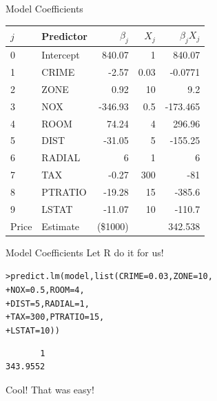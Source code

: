 \documentclass{beamer}\usepackage[]{graphicx}\usepackage[]{color}
\makeatletter
\newcommand{\hlnum}[1]{\textcolor[rgb]{0.824,0.412,0.118}{#1}}%
\newcommand{\hlstd}[1]{\textcolor[rgb]{1,0.894,0.769}{#1}}%
\newcommand{\hlkwc}[1]{\textcolor[rgb]{0.78,0.941,0.545}{#1}}%
\newcommand{\hlkwd}[1]{\textcolor[rgb]{1,0.78,0.769}{#1}}%
\newenvironment{kframe}{%
 \def\at@end@of@kframe{}%
 \ifinner\ifhmode%
  \def\at@end@of@kframe{\end{minipage}}%
  \begin{minipage}{\columnwidth}%
 \fi\fi%
 \def\FrameCommand##1{\hskip\@totalleftmargin \hskip-\fboxsep
 \colorbox{shadecolor}{##1}\hskip-\fboxsep
     \hskip-\linewidth \hskip-\@totalleftmargin \hskip\columnwidth}%
 \MakeFramed {\advance\hsize-\width
   \@totalleftmargin\z@ \linewidth\hsize
   \@setminipage}}%
 {\par\unskip\endMakeFramed%
 \at@end@of@kframe}
\newenvironment{knitrout}{}{} %
\makeatother
\begin{document}
\begin{darkframes}
\begin{frame}[fragile]{Model Coefficients}
\begin{table}[!b]
{\begin{tabularx}{\textwidth}{XXrrr}
           $j$ & Predictor  & $\beta_j$   &  $X_j$  & $\beta_j X_j$ \\ 
          \toprule
            0 & Intercept	&	840.07	&	1	&	840.07  \\
            1 & CRIME	&	-2.57	&	0.03	&	-0.0771  \\
            2 & ZONE	&	0.92	&	10	&	9.2  \\
            3 & NOX	&	-346.93	&	0.5	&	-173.465  \\
            4 & ROOM	&	74.24	&	4	&	296.96  \\
            5 & DIST	&	-31.05	&	5	&	-155.25  \\
            6 & RADIAL	&	6	&	1	&	6  \\
            7 & TAX	&	-0.27	&	300	&	-81  \\
            8 & PTRATIO	&	-19.28	&	15	&	-385.6  \\
            9 & LSTAT	&	-11.07	&	10	&	-110.7  \\
          \bottomrule
             Price &  Estimate 	& (\$1000)		&		&	342.538   \\
        
        
        \end{tabularx}}
        
      \end{table} 
      
    \end{frame}



    \begin{frame}[fragile]{Model Coefficients}
    \fontsize{9}{9}\selectfont
      Let R do it for us!
      
\begin{knitrout}
\begin{kframe}
\begin{alltt}
\hlstd{> }\hlkwd{predict.lm}\hlstd{(model,} \hlkwd{list}\hlstd{(}\hlkwc{CRIME}\hlstd{=}\hlnum{0.03}\hlstd{,} \hlkwc{ZONE}\hlstd{=}\hlnum{10}\hlstd{,}
\hlstd{+ }                       \hlkwc{NOX}\hlstd{=}\hlnum{0.5}\hlstd{,} \hlkwc{ROOM}\hlstd{=}\hlnum{4}\hlstd{,}
\hlstd{+ }                       \hlkwc{DIST}\hlstd{=}\hlnum{5}\hlstd{,}  \hlkwc{RADIAL}\hlstd{=}\hlnum{1}\hlstd{,}
\hlstd{+ }                       \hlkwc{TAX}\hlstd{=}\hlnum{300}\hlstd{,} \hlkwc{PTRATIO}\hlstd{=}\hlnum{15}\hlstd{,}
\hlstd{+ }                       \hlkwc{LSTAT}\hlstd{=}\hlnum{10}\hlstd{))}
\end{alltt}
\begin{verbatim}
       1 
343.9552 
\end{verbatim}
\end{kframe}
\end{knitrout}
      \pause
      Cool! That was easy!
      

\end{frame}
\end{darkframes}
\end{document}
